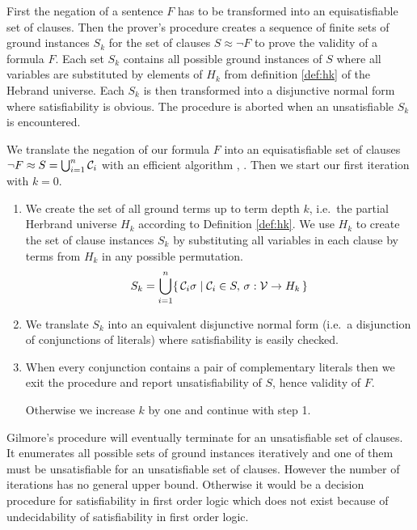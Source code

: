 First the negation of a sentence $F$ has to be transformed into an equisatisfiable set of clauses.
Then the prover's procedure 
creates a sequence of finite sets of ground instances $S_k$ 
for the set of clauses $S\approx\lnot F$ to prove the validity of a formula $F$.
Each set $S_k$ contains all possible ground instances of $S$ 
where all variables are substituted by elements of $H_k$
from definition \ref{def:hk} of the Hebrand universe.
Each $S_k$ is then transformed into a disjunctive normal form where satisfiability is obvious.
The procedure is aborted when an unsatisfiable $S_k$ is encountered.

\begin{procedure}\label{proc:gilmore's:prover}
	We translate the negation of our formula $F$ into an equisatisfiable set of clauses 
	$\lnot F \approx S = \bigcup_{i=1}^{n} {\mathcal C}_i$ with an efficient algorithm \cite{tseitin70}, \cite{PLAISTED1986293}.
	Then we start our first iteration with $k=0$.
	\begin{enumerate}
		
		\item We create the set of all ground terms up to term depth $k$, 
		i.e.~the partial Herbrand universe $H_k$ according to Definition \ref{def:hk}. 
		We use $H_k$ to create the set of clause instances $S_k$ 
		by substituting all variables 
		in each clause by terms from $H_k$ in any possible permutation.
		\[ S_k = \bigcup_{i=1}^{n} 
		\{\,
		{\mathcal C}_i\sigma \mid {\mathcal C}_i \in S,\,\sigma: {\mathcal V}\to H_k
		\,\}
		\]
		
		\item We translate $S_k$ into an equivalent disjunctive normal form 
		(i.e.~a disjunction of conjunctions of literals)
		where satisfiability is easily checked.
		
		
		
		\item When every conjunction contains a pair of complementary literals 
		then we exit the procedure and report unsatisfiability of $S$, 
		hence validity of $F$.
		
		Otherwise we increase $k$ by one and continue with step 1.
	\end{enumerate}
\end{procedure}

Gilmore's procedure will eventually terminate for an unsatisfiable set of clauses.
It enumerates all possible sets of ground instances iteratively
and one of them must be unsatisfiable for an unsatisfiable set of clauses. 
However the number of iterations has no general upper bound. 
Otherwise it would be a decision procedure for satisfiability in first order logic
which does not exist because of undecidability of satisfiability in first order logic.


